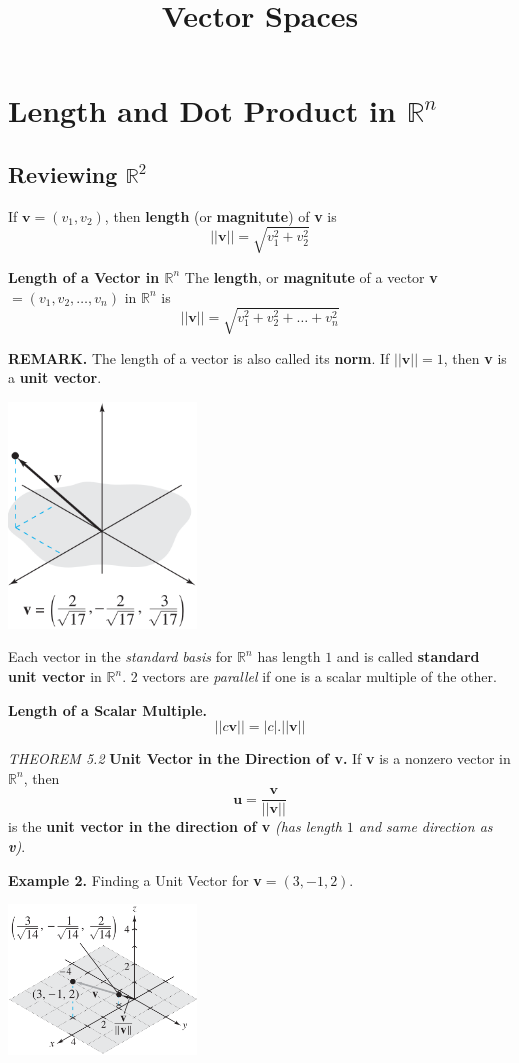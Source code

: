 \documentclass{article}
\title{Vector Spaces}
\date{}
\newcommand\B{\textbf}
\newcommand\tcl{\begin{tcolorbox}[colback = {blue9}]}
\newcommand\etcl{\end{tcolorbox}}
\newcommand\R{\mathbb{R}}
\newcommand\T{\textit}
\begin{document}
    \section{Length and Dot Product in $\R^n$}
        
    \subsection{Reviewing $\R^2$}
    If $\B{v} = (v_1, v_2)$, then \B{length} (or \B{magnitute}) of \B{v} is
    \[ ||\B{v}|| = \sqrt{v_1^2 + v_2^2}\]

    \tcl
        \B{Length of a Vector in $\R^n$}
            The \B{length}, or \B{magnitute} of a vector \B{v}$ = (v_1, v_2, \dots, v_n)$ in $\R^n$ is 
            \[ ||\B{v}|| = \sqrt{v_1^2 + v_2^2 +  \dots + v_n^2}\]
    \etcl 
    \B{REMARK. } The length of a vector is also called its \B{norm}. If $||\B{v}|| = 1$, then \B{v}
    is a \B{unit vector}.
    \begin{center}
        \includegraphics[width = 5cm]{images/lengthr3.png}
    \end{center}
    Each vector in the \T{standard basis} for $\R^n$ has length $1$ and is called \B{standard unit vector}
    in $\R^n$. 2 vectors are \T{parallel} if one is a scalar multiple of the other.
    
    \tcl
        \B{Length of a Scalar Multiple. }
        \[ ||c\B{v}|| = |c|.||\B{v}||\]
    \etcl 

    \tcl
    \T{THEOREM 5.2} \B{Unit Vector in the Direction of v. } If \B{v} is a nonzero vector in $\R^n$, then
    \[\B{u} = \frac{\B{v}}{||\B{v}||} \]
    is the \B{unit vector in the direction of v} \T{(has length $1$ and same direction as \B{v})}.
    \etcl 

    \B{Example 2. } Finding a Unit Vector for \B{v}$ = (3, -1, 2)$.
    \begin{center}
        \includegraphics[width = 5cm]{images/egunitv.png}
    \end{center}
    
\end{document}
